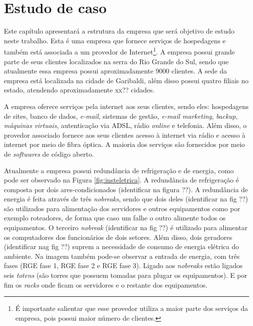 \chapter{Estudo de caso}
\label{cap:estudodecaso}

Este capítulo apresentará a estrutura da empresa que será objetivo de estudo neste trabalho. Esta é uma empresa que fornece serviços de 
hospedagens e também está associada a um provedor de Internet\footnote{É importante salientar que esse provedor utiliza a maior parte dos 
serviços da empresa, pois possui maior número de clientes.}. A empresa possui grande parte de seus clientes localizados na serra do 
Rio Grande do Sul, sendo que atualmente essa empresa possui aproximadamente 9000 clientes. A sede da empresa está localizada na cidade de 
Garibaldi, além disso possui quatro filiais no estado, atendendo aproximadamente xx?? cidades.

A empresa oferece serviços pela internet aos seus clientes, sendo eles: hospedagens de sites, banco de dados, \textit{e-mail}, sistemas de gestão, 
\textit{e-mail marketing}, \textit{backup}, \textit{máquinas virtuais}, autenticação via \ac{ADSL}, rádio \textit{online} e telefonia.
Além disso, o provedor associado fornece aos seus clientes acesso à internet via rádio e acesso à internet por meio de fibra óptica.
A maioria dos serviços são fornecidos por meio de \textit{softwares} de código aberto.

Atualmente a empresa possui redundância de refrigeração e de energia, como pode ser observado na Figura \ref{fig:insteletrica}. 
A redundância de refrigeração é composta por dois ares-condicionados (identificar na figura ??). 
A redundância de energia é feita através de três \textit{nobreaks}, sendo que dois deles (identificar na fig ??) são utilizados para alimentação 
dos servidores e outros equipamentos como por exemplo roteadores, de forma que caso um falhe o outro alimente todos os equipamentos. O terceiro 
\textit{nobreak} (identificar na fig ??) é utilizado para alimentar os computadores dos funcionários de dois setores. 
Além disso, dois geradores (identificar nag fig ??) suprem a necessidade de consumo de energia elétrica do ambiente.
Na imagem também pode-se observar a entrada de energia, com três fases (RGE fase 1, RGE fase 2 e RGE fase 3). Ligado aos \textit{nobreaks} estão 
ligados seis \textit{totens} (são torres que possuem tomadas para plugar os equipamentos). E por fim os \textit{racks} onde ficam os servidores
e o restante dos equipamentos.

